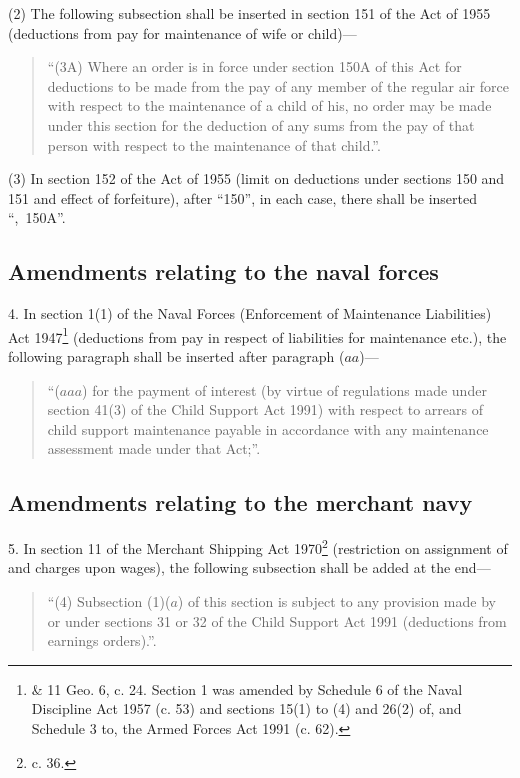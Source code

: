 \documentclass[a4paper]{article}
\begin{document}
(2) The following subsection shall be inserted in section 151 of the Act of 1955 (deductions from pay for maintenance of wife or child)—
\begin{quotation}
“(3A) Where an order is in force under section 150A of this Act for deductions to be made from the pay of any member of the regular air force with respect to the maintenance of a child of his, no order may be made under this section for the deduction of any sums from the pay of that person with respect to the maintenance of that child.”.
\end{quotation}

(3) In section 152 of the Act of 1955 (limit on deductions under sections 150 and 151 and effect of forfeiture), after “150”, in each case, there shall be inserted “,~150A”.

\subsection[4. Amendments relating to the naval forces]{Amendments relating to the naval forces}

4.  In section 1(1) of the Naval Forces (Enforcement of Maintenance Liabilities) Act 1947\footnote{ \& 11 Geo. 6, c. 24. Section 1 was amended by Schedule 6 of the Naval Discipline Act 1957 (c. 53) and sections 15(1) to (4) and 26(2) of, and Schedule 3 to, the Armed Forces Act 1991 (c. 62).} (deductions from pay in respect of liabilities for maintenance etc.), the following paragraph shall be inserted after paragraph ($aa$)—
\begin{quotation}
“($aaa$) for the payment of interest (by virtue of regulations made under section 41(3) of the Child Support Act 1991) with respect to arrears of child support maintenance payable in accordance with any maintenance assessment made under that Act;”.
\end{quotation}

\subsection[5. Amendments relating to the merchant navy]{Amendments relating to the merchant navy}

5.  In section 11 of the Merchant Shipping Act 1970\footnote{ c. 36.} (restriction on assignment of and charges upon wages), the following subsection shall be added at the end—
\begin{quotation}
“(4) Subsection (1)($a$) of this section is subject to any provision made by or under sections 31 or 32 of the Child Support Act 1991 (deductions from earnings orders).”.
\end{quotation}
\end{document}
